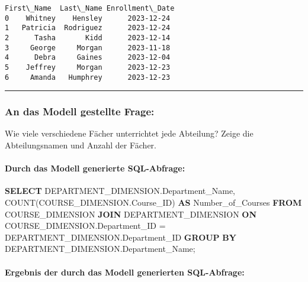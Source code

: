 \documentclass[11pt]{article}
\newenvironment{Shaded}{}{}
\newcommand{\KeywordTok}[1]{\textcolor[rgb]{0.00,0.44,0.13}{\textbf{{#1}}}}
\newcommand{\FunctionTok}[1]{\textcolor[rgb]{0.02,0.16,0.49}{{#1}}}
\newcommand{\NormalTok}[1]{{#1}}
\newcommand{\OperatorTok}[1]{\textcolor[rgb]{0.40,0.40,0.40}{{#1}}}
\begin{document}
    
    
    \begin{Verbatim}[commandchars=\\\{\}]
  First\_Name  Last\_Name Enrollment\_Date
0    Whitney    Hensley      2023-12-24
1   Patricia  Rodriguez      2023-12-24
2      Tasha       Kidd      2023-12-14
3     George     Morgan      2023-11-18
4      Debra     Gaines      2023-12-04
5    Jeffrey     Morgan      2023-12-23
6     Amanda   Humphrey      2023-12-23
    \end{Verbatim}

    
    \begin{center}\rule{0.5\linewidth}{0.5pt}\end{center}

    
    \hypertarget{an-das-modell-gestellte-frage}{%
\subsubsection{An das Modell gestellte
Frage:}\label{an-das-modell-gestellte-frage}}

Wie viele verschiedene Fächer unterrichtet jede Abteilung? Zeige die
Abteilungsnamen und Anzahl der Fächer.

    
    \hypertarget{durch-das-modell-generierte-sql-abfrage}{%
\paragraph{Durch das Modell generierte
SQL-Abfrage:}\label{durch-das-modell-generierte-sql-abfrage}}

\begin{Shaded}
\begin{Highlighting}[]
\KeywordTok{SELECT}\NormalTok{ DEPARTMENT\_DIMENSION.Department\_Name, }\FunctionTok{COUNT}\NormalTok{(COURSE\_DIMENSION.Course\_ID) }\KeywordTok{AS}\NormalTok{ Number\_of\_Courses}
\KeywordTok{FROM}\NormalTok{ COURSE\_DIMENSION}
\KeywordTok{JOIN}\NormalTok{ DEPARTMENT\_DIMENSION }\KeywordTok{ON}\NormalTok{ COURSE\_DIMENSION.Department\_ID }\OperatorTok{=}\NormalTok{ DEPARTMENT\_DIMENSION.Department\_ID}
\KeywordTok{GROUP} \KeywordTok{BY}\NormalTok{ DEPARTMENT\_DIMENSION.Department\_Name;}
\end{Highlighting}
\end{Shaded}

    
    \hypertarget{ergebnis-der-durch-das-modell-generierten-sql-abfrage}{%
\paragraph{Ergebnis der durch das Modell generierten
SQL-Abfrage:}\label{ergebnis-der-durch-das-modell-generierten-sql-abfrage}}
\end{document}
